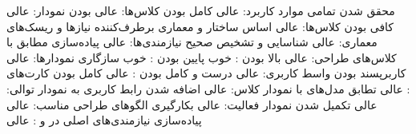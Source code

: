 
  محقق شدن تمامی موارد کاربرد: عالی
  کامل بودن کلاس‌ها: عالی
   بودن نمودار: عالی
  کافی بودن کلاس‌ها: عالی
  اساس ساختار و معماری برطرف‌کننده نیاز‌ها و ریسک‌های معماری: عالی
  شناسایی و تشخیص صحیح نیازمندی‌ها: عالی
  پیاده‌سازی مطابق با کلاس‌های طراحی: عالی
  بالا بودن : خوب
  پایین بودن : خوب
  سازگاری نمودارها:‌ عالی
  کاربرپسند بودن واسط کاربری: عالی
  درست و کامل بودن : عالی
  کامل بودن کارت‌های : عالی
 تطابق مدل‌های  با نمودار کلاس: عالی
 اضافه شدن رابط کاربری به نمودار توالی: عالی
 تکمیل شدن نمودار فعالیت: عالی
 بکارگیری الگوهای طراحی مناسب: عالی
 پیاده‌سازی نیازمندی‌های اصلی در  و : عالی

